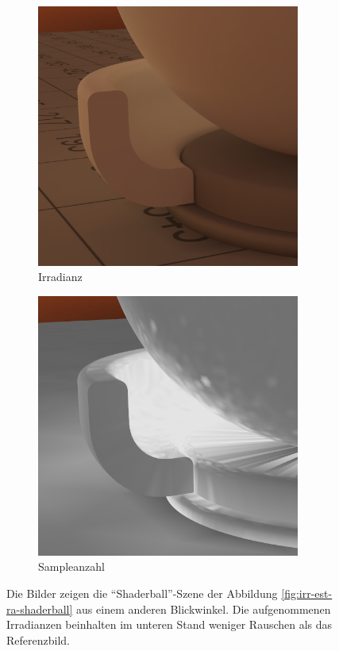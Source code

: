 \begin{figure}[h]
\begin{subfigure}[t]{0.33\textwidth}
				\includegraphics[width=0.95\textwidth]{pic/irr_est-ra-shaderball2-irr.png}
				\caption{Irradianz}
			\end{subfigure}
			\begin{subfigure}[t]{0.33\textwidth}
				\center
				\includegraphics[width=0.95\textwidth]{pic/irr_est-ra-shaderball2-scount.png}
				\caption{Sampleanzahl}
			\end{subfigure}
			\caption[Zweite adaptive Vertex-Irradiance-Map anhand der \enquote{Shaderball}-Szene]{Die Bilder zeigen die \enquote{Shaderball}-Szene der Abbildung \ref{fig:irr-est-ra-shaderball} aus einem anderen Blickwinkel. Die aufgenommenen Irradianzen beinhalten im unteren Stand weniger Rauschen als das Referenzbild.}
			\label{fig:irr-est-ra-shaderball2}
		\end{figure}

